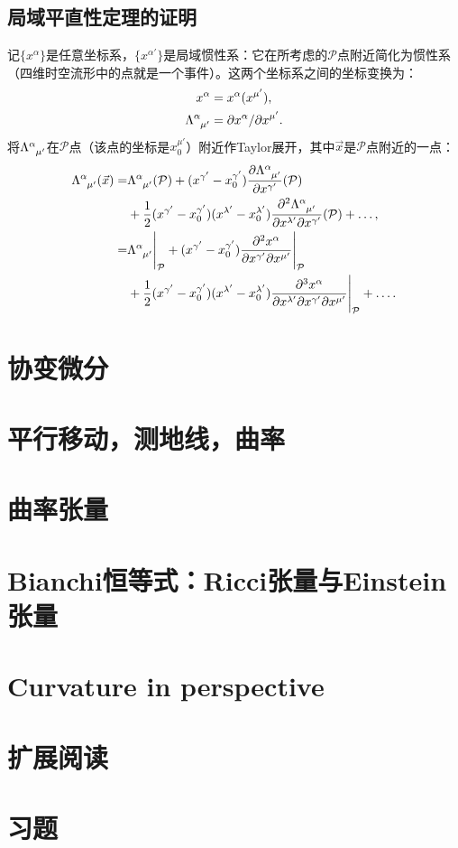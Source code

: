 \subsection*{局域平直性定理的证明}
记$\{ x^\alpha \}$是任意坐标系，$\{ x^{\alpha'}\}$是局域惯性系：它在所考虑的$\mathcal{P}$点附近简化为惯性系（四维时空流形中的点就是一个事件）。这两个坐标系之间的坐标变换为：
\begin{align}
    x^\alpha &= x^\alpha (x^{\mu'}), \label{equ6.21} \\
    \Lambda\indices{^\alpha_{\mu'}} &= \partial x^\alpha / \partial x^{\mu'}. \label{equ6.22}
\end{align}
将$\Lambda\indices{^\alpha_{\mu'}}$在$\mathcal{P}$点（该点的坐标是$x_0^{\mu'}$）附近作Taylor展开，其中$\vec{x}$是$\mathcal{P}$点附近的一点：
\begin{align}
    \Lambda\indices{^\alpha_{\mu'}} (\vec{x}) =& \Lambda\indices{^\alpha_{\mu'}} (\mathcal{P}) + (x^{\gamma'} - x_0^{\gamma'}) \frac{\partial \Lambda\indices{^\alpha_{\mu'}}}{\partial x^{\gamma'}} (\mathcal{P}) \notag \\
    &+ \frac{1}{2} (x^{\gamma'} - x_0^{\gamma'}) (x^{\lambda'} - x_0^{\lambda'}) \frac{ \partial^2 \Lambda\indices{^\alpha_{\mu'}} }{ \partial x^{\lambda'} \partial x^{\gamma'} } (\mathcal{P}) + \dots , \notag \\
    =& \Lambda\indices{^\alpha_{\mu'}}\Bigg|_{\mathcal{P}} + (x^{\gamma'} - x_0^{\gamma'} ) \frac{ \partial^2 x^\alpha }{ \partial x^{\gamma'} \partial x^{\mu'} } \Bigg|_{\mathcal{P}} \notag \\
    &+ \frac{1}{2} (x^{\gamma'} - x_0^{\gamma'})(x^{\lambda'} - x_0^{\lambda'}) \frac{ \partial^3 x^\alpha }{ \partial x^{\lambda'} \partial x^{\gamma'} \partial x^{\mu'} } \Bigg|_{\mathcal{P}} + \dots. \label{equ6.23}
\end{align}


\section{协变微分}
\label{sec6.3}

\section{平行移动，测地线，曲率}
\label{sec6.4}

\section{曲率张量}
\label{sec6.5}

\section{Bianchi恒等式：Ricci张量与Einstein张量}
\label{sec6.6}

\section{Curvature in perspective}
\label{sec6.7}

\section{扩展阅读}
\label{sec6.8}

\section{习题}
\label{sec6.9}